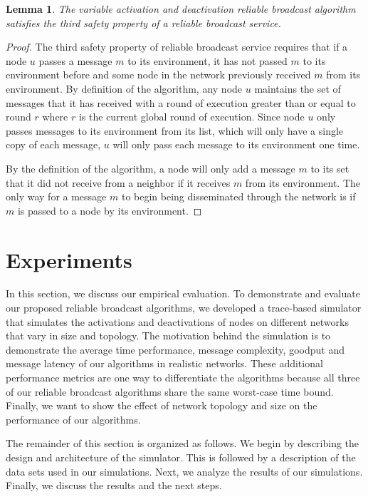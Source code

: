 \documentclass[english]{article}
\newtheorem{lemma}[theorem]{Lemma}
\begin{document}
\begin{lemma}
\label{DeactivationRBSafety3}
The variable activation and deactivation reliable broadcast algorithm satisfies the third safety property of a reliable broadcast service.
\end{lemma}
\begin{proof}

The third safety property of reliable broadcast service requires that if a node $u$ passes a message $m$ to its environment, it has not passed $m$ to its environment before and some node in the network previously received $m$ from its environment. By definition of the algorithm, any node $u$ maintains the set of messages that it has received with a round of execution greater than or equal to round $r$ where $r$ is the current global round of execution. Since node $u$ only passes messages to its environment from its list, which will only have a single copy of each message, $u$ will only pass each message to its environment one time. 

By the definition of the algorithm, a node will only add a message $m$ to its set that it did not receive from a neighbor if it receives $m$ from its environment. The only way for a message $m$ to begin being disseminated through the network is if $m$ is passed to a node by its environment. 

\end{proof}



\section{Experiments}

In this section, we discuss our empirical evaluation. To demonstrate and evaluate our proposed reliable broadcast algorithms, we developed a trace-based simulator that simulates the activations and deactivations of nodes on different networks that vary in size and topology. The motivation behind the simulation is to demonstrate the average time performance, message complexity, goodput and message latency of our algorithms in realistic networks. These additional performance metrics are one way to differentiate the algorithms because all three of our reliable broadcast algorithms share the same worst-case time bound. Finally, we want to show the effect of network topology and size on the performance of our algorithms. 

The remainder of this section is organized as follows. We begin by describing the design and architecture of the simulator. This is followed by a description of the data sets used in our simulations. Next, we analyze the results of our simulations. Finally, we discuss the results and the next steps. 
\end{document}
